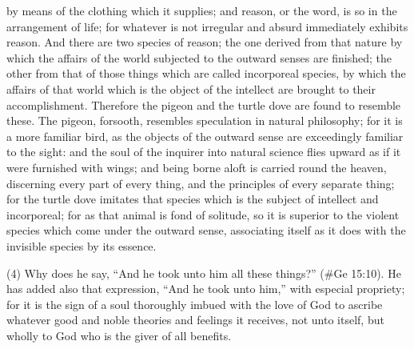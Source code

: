 by means of the clothing which it supplies; and reason, or the word, is so in the arrangement of life;
for whatever is not irregular and absurd immediately exhibits reason. And there are two species of
reason; the one derived from that nature by which the affairs of the world subjected to the outward
senses are finished; the other from that of those things which are called incorporeal species, by
which the affairs of that world which is the object of the intellect are brought to their
accomplishment. Therefore the pigeon and the turtle dove are found to resemble these. The
pigeon, forsooth, resembles speculation in natural philosophy; for it is a more familiar bird, as the
objects of the outward sense are exceedingly familiar to the sight: and the soul of the inquirer into
natural science flies upward as if it were furnished with wings; and being borne aloft is carried
round the heaven, discerning every part of every thing, and the principles of every separate thing;
for the turtle dove imitates that species which is the subject of intellect and incorporeal; for as that
animal is fond of solitude, so it is superior to the violent species which come under the outward
sense, associating itself as it does with the invisible species by its essence.

(4) Why does he say, ``And he took unto him all these things?'' (\#Ge 15:10). He has added
also that expression, ``And he took unto him,'' with especial propriety; for it is the sign of a soul
thoroughly imbued with the love of God to ascribe whatever good and noble theories and feelings it
receives, not unto itself, but wholly to God who is the giver of all benefits.

